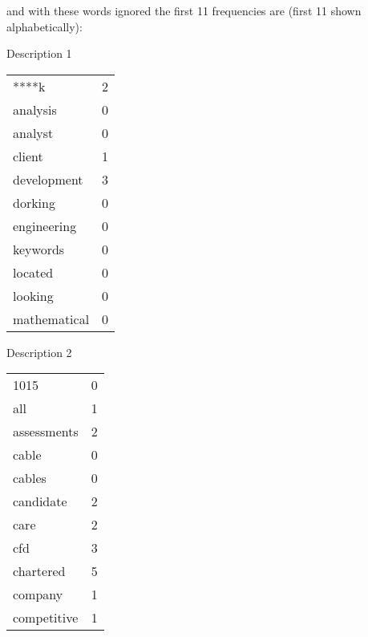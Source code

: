 \documentclass[12pt]{article}
\begin{document}
    \noindent and with these words ignored the
    first 11 frequencies are (first 11 shown alphabetically):


    \begin{center}
    \begin{minipage}[t]{.4\textwidth}
    Description 1
    \newline
    \newline
        \begin{tabular}{l|c}
            ****k & 2 \\
            analysis & 0 \\
            analyst & 0 \\
            client & 1 \\
            development & 3 \\
            dorking & 0 \\
            engineering & 0 \\
            keywords & 0 \\
            located & 0 \\
            looking & 0 \\
            mathematical & 0 \\
        \end{tabular}
    \end{minipage}
    \begin{minipage}[t]{.4\textwidth}
    Description 2
    \newline
    \newline
        \begin{tabular}{l|c}
            1015 & 0 \\
            all & 1 \\
            assessments & 2 \\
            cable & 0 \\
            cables & 0 \\
            candidate & 2 \\
            care & 2 \\
            cfd & 3 \\
            chartered & 5 \\
            company & 1 \\
            competitive & 1 \\
        \end{tabular}
    \end{minipage}
    \end{center}
\end{document}

